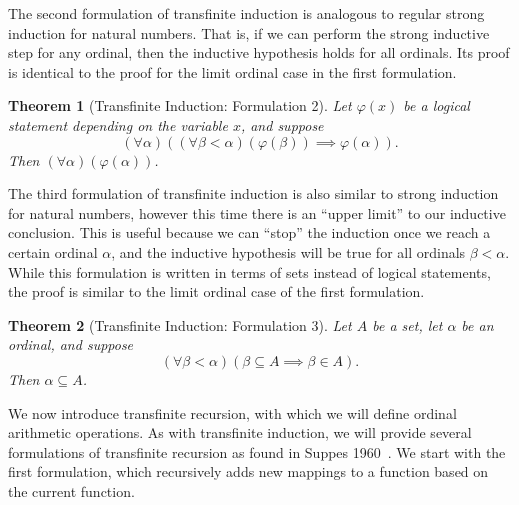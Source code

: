 \documentclass[a4paper,11pt]{article}
\theoremstyle{plain}
\newtheorem{thm}{Theorem}[subsection]
\theoremstyle{definition}
\theoremstyle{remark}
\begin{document}
The second formulation of transfinite induction is analogous to regular strong induction for natural numbers. That is, if we can perform the strong inductive step for any ordinal, then the inductive hypothesis holds for all ordinals. Its proof is identical to the proof for the limit ordinal case in the first formulation.

\begin{thm}[Transfinite Induction: Formulation 2]
\label{thm:Tinduction2}
Let $\varphi(x)$ be a logical statement depending on the variable $x$, and suppose
\[(\forall\alpha)((\forall\beta<\alpha)(\varphi(\beta)) \implies \varphi(\alpha)).\]
Then $(\forall\alpha)(\varphi(\alpha))$.
\end{thm}

The third formulation of transfinite induction is also similar to strong induction for natural numbers, however this time there is an ``upper limit'' to our inductive conclusion. This is useful because we can ``stop'' the induction once we reach a certain ordinal $\alpha$, and the inductive hypothesis will be true for all ordinals $\beta<\alpha$. While this formulation is written in terms of sets instead of logical statements, the proof is similar to the limit ordinal case of the first formulation.

\begin{thm}[Transfinite Induction: Formulation 3]
\label{thm:Tinduction3}
Let $A$ be a set, let $\alpha$ be an ordinal, and suppose
\[(\forall \beta<\alpha)(\beta\subseteq A \implies \beta\in A).\]
Then $\alpha\subseteq A$.
\end{thm}

We now introduce transfinite recursion, with which we will define ordinal arithmetic operations. As with transfinite induction, we will provide several formulations of transfinite recursion as found in Suppes 1960~\citep[pp. 202--205]{SuppesBook}. We start with the first formulation, which recursively adds new mappings to a function based on the current function.
\end{document}
